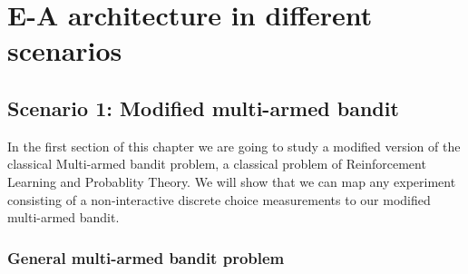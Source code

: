 \documentclass[11pt,a4paper,twoside]{report}
\newcommand{\+}{\textnormal{+} }
\theoremstyle{definition}
\numberwithin{equation}{chapter}
\begin{document}
\chapter{E-A architecture in different scenarios} 
\label{Scenarios}
\section{Scenario 1: Modified multi-armed bandit}
In the first section of this chapter we are going to study a modified version of
the classical Multi-armed bandit problem, a classical problem of Reinforcement 
Learning and Probablity Theory. We will show that we can map any experiment 
consisting of a non-interactive discrete choice measurements to our modified
multi-armed bandit. 

\subsection{General multi-armed bandit problem}
\end{document}
